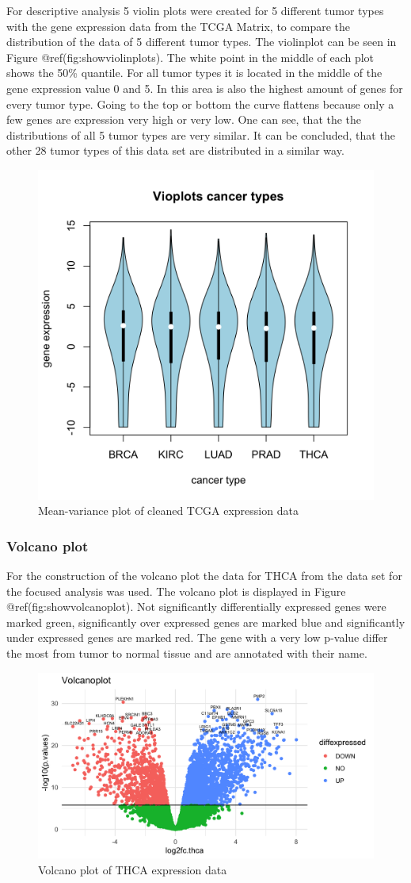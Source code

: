 \documentclass[
  parskip,
  oneside]{scrreprt}
\begin{document}
For descriptive analysis 5 violin plots were created for 5 different
tumor types with the gene expression data from the TCGA Matrix, to
compare the distribution of the data of 5 different tumor types. The
violinplot can be seen in Figure @ref(fig:showviolinplots). The white
point in the middle of each plot shows the 50\% quantile. For all tumor
types it is located in the middle of the gene expression value 0 and 5.
In this area is also the highest amount of genes for every tumor type.
Going to the top or bottom the curve flattens because only a few genes
are expression very high or very low. One can see, that the the
distributions of all 5 tumor types are very similar. It can be
concluded, that the other 28 tumor types of this data set are
distributed in a similar way.

\begin{figure}

{\centering \includegraphics[width=0.3\linewidth]{figures/Vioplots cancer types} 

}

\caption{Mean-variance plot of cleaned TCGA expression data}\label{fig:showviolinplots}
\end{figure}

\hypertarget{volcano-plot}{%
\subsubsection{Volcano plot}\label{volcano-plot}}

For the construction of the volcano plot the data for THCA from the data
set for the focused analysis was used. The volcano plot is displayed in
Figure @ref(fig:showvolcanoplot). Not significantly differentially
expressed genes were marked green, significantly over expressed genes
are marked blue and significantly under expressed genes are marked red.
The gene with a very low p-value differ the most from tumor to normal
tissue and are annotated with their name.

\begin{figure}

{\centering \includegraphics[width=0.3\linewidth]{figures/Volcanoplot} 

}

\caption{Volcano plot of THCA expression data}\label{fig:showvolcanoplot}
\end{figure}
\end{document}
